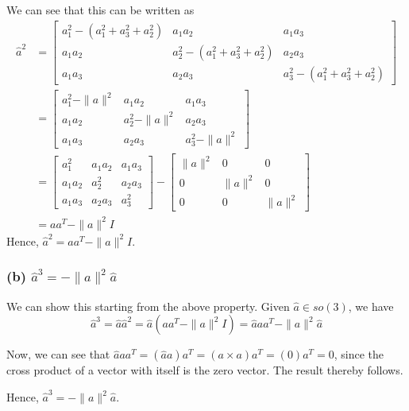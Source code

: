 We can see that this can be written as
\begin{align*}
     \hat{a}^{2}
      & =
     \begin{bmatrix}
          a_{1}^{2}-(a_{1}^{2}+a_{3}^{2}+a_{2}^{2}) & a_{1} a_{2}                               & a_{1} a_{3}                               \\
          a_{1} a_{2}                               & a_{2}^{2}-(a_{1}^{2}+a_{3}^{2}+a_{2}^{2}) & a_{2} a_{3}                               \\
          a_{1} a_{3}                               & a_{2} a_{3}                               & a_{3}^{2}-(a_{1}^{2}+a_{3}^{2}+a_{2}^{2})
     \end{bmatrix}
     \\ & =
     \begin{bmatrix}
          a_{1}^{2}-\|a\|^{2} & a_{1} a_{2}         & a_{1} a_{3}         \\
          a_{1} a_{2}         & a_{2}^{2}-\|a\|^{2} & a_{2} a_{3}         \\
          a_{1} a_{3}         & a_{2} a_{3}         & a_{3}^{2}-\|a\|^{2}
     \end{bmatrix}
     \\ & =
     \begin{bmatrix}
          a_{1}^{2}   & a_{1} a_{2} & a_{1} a_{3} \\
          a_{1} a_{2} & a_{2}^{2}   & a_{2} a_{3} \\
          a_{1} a_{3} & a_{2} a_{3} & a_{3}^{2}
     \end{bmatrix}
     -
     \begin{bmatrix}
          \|a\|^{2} & 0         & 0         \\
          0         & \|a\|^{2} & 0         \\
          0         & 0         & \|a\|^{2}
     \end{bmatrix}
     \\ & =
     a a^{T}-\|a\|^{2} I
\end{align*}
Hence, \( \boxed{ \hat{a}^{2}=a a^{T}-\|a\|^{2} I } \).

\subsubsection*{(b) \( \hat{a}^{3}=-\|a\|^{2} \hat{a} \)}

We can show this starting from the above property.
Given \( \hat{a} \in s o(3) \), we have
\[
     \hat{a}^{3}
     =
     \hat{a} \hat{a}^{2}
     =
     \hat{a} (a a^{T}-\|a\|^{2} I)
     =
     \hat{a} a a^{T}-\|a\|^{2} \hat{a}
\]

Now, we can see that \( \hat{a} a a^{T} = (\hat{a} a) a^{T} = (a \times a) a^T  = (0) a^T = 0 \), since the cross product of a vector with itself is the zero vector.
The result thereby follows.

Hence, \( \boxed{ \hat{a}^{3}=-\|a\|^{2} \hat{a} } \).
